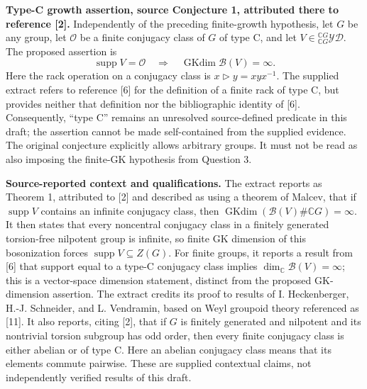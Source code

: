 \documentclass[11pt]{article}
\newcommand{\C}{\mathbb{C}}
\begin{document}
\textbf{Type-C growth assertion, source Conjecture 1, attributed there to reference [2].} Independently of the preceding finite-growth hypothesis, let \(G\) be any group, let \(\mathcal O\) be a finite conjugacy class of \(G\) of type C, and let \(V\in{}^{\C G}_{\C G}\mathcal{YD}\). The proposed assertion is
\[
\operatorname{supp}V=\mathcal O
\quad\Longrightarrow\quad
\operatorname{GKdim}\mathcal B(V)=\infty.
\]
Here the rack operation on a conjugacy class is \(x\triangleright y=xyx^{-1}\). The supplied extract refers to reference [6] for the definition of a finite rack of type C, but provides neither that definition nor the bibliographic identity of [6]. Consequently, ``type C'' remains an unresolved source-defined predicate in this draft; the assertion cannot be made self-contained from the supplied evidence. The original conjecture explicitly allows arbitrary groups. It must not be read as also imposing the finite-GK hypothesis from Question 3.

\textbf{Source-reported context and qualifications.} The extract reports as Theorem 1, attributed to [2] and described as using a theorem of Malcev, that if \(\operatorname{supp}V\) contains an infinite conjugacy class, then \(\operatorname{GKdim}(\mathcal B(V)\#\C G)=\infty\). It then states that every noncentral conjugacy class in a finitely generated torsion-free nilpotent group is infinite, so finite GK dimension of this bosonization forces \(\operatorname{supp}V\subseteq Z(G)\). For finite groups, it reports a result from [6] that support equal to a type-C conjugacy class implies \(\dim_{\C}\mathcal B(V)=\infty\); this is a vector-space dimension statement, distinct from the proposed GK-dimension assertion. The extract credits its proof to results of I. Heckenberger, H.-J. Schneider, and L. Vendramin, based on Weyl groupoid theory referenced as [11]. It also reports, citing [2], that if \(G\) is finitely generated and nilpotent and its nontrivial torsion subgroup has odd order, then every finite conjugacy class is either abelian or of type C. Here an abelian conjugacy class means that its elements commute pairwise. These are supplied contextual claims, not independently verified results of this draft.
\end{document}
